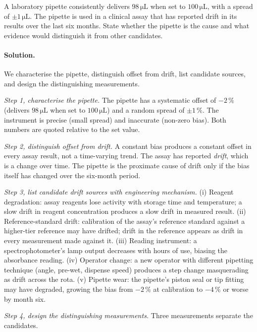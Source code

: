 \begin{exercise}
A laboratory pipette consistently delivers $98 \,\si{\micro\liter}$
when set to $100 \,\si{\micro\liter}$, with a spread of
$\pm 1 \,\si{\micro\liter}$. The pipette is used in a clinical assay
that has reported drift in its results over the last six months. State
whether the pipette is the cause and what evidence would distinguish
it from other candidates.

\paragraph{Solution.}
We characterise the pipette, distinguish offset from drift, list
candidate sources, and design the distinguishing measurements.

\textit{Step 1, characterise the pipette.} The pipette has a
systematic offset of $-2\,\%$ (delivers $98 \,\si{\micro\liter}$ when
set to $100 \,\si{\micro\liter}$) and a random spread of
$\pm 1\,\%$. The instrument is precise (small spread) and inaccurate
(non-zero bias). Both numbers are quoted relative to the set value.

\textit{Step 2, distinguish offset from drift.} A constant bias
produces a constant offset in every assay result, not a time-varying
trend. The assay has reported \emph{drift}, which is a change over
time. The pipette is the proximate cause of drift only if the bias
itself has changed over the six-month period.

\textit{Step 3, list candidate drift sources with engineering
mechanism.} (i) Reagent degradation: assay reagents lose activity
with storage time and temperature; a slow drift in reagent
concentration produces a slow drift in measured result. (ii)
Reference-standard drift: calibration of the assay's reference
standard against a higher-tier reference may have drifted; drift in
the reference appears as drift in every measurement made against it.
(iii) Reading instrument: a spectrophotometer's lamp output decreases
with hours of use, biasing the absorbance reading. (iv) Operator
change: a new operator with different pipetting technique (angle,
pre-wet, dispense speed) produces a step change masquerading as drift
across the rota. (v) Pipette wear: the pipette's piston seal or tip
fitting may have degraded, growing the bias from $-2\,\%$ at
calibration to $-4\,\%$ or worse by month six.

\textit{Step 4, design the distinguishing measurements.} Three
measurements separate the candidates.


\end{exercise}
